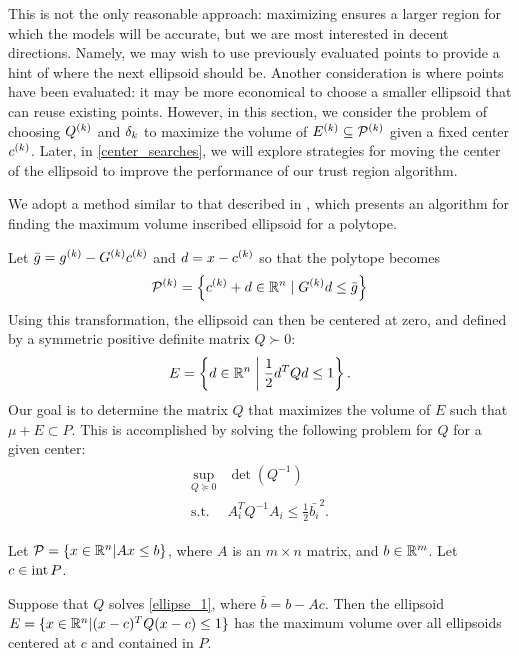 This is not the only reasonable approach: maximizing ensures a larger region for which the models will be accurate, 
but we are most interested in decent directions.
Namely, we may wish to use previously evaluated points to provide a hint of where the next ellipsoid should be.
Another consideration is where points have been evaluated: it may be more economical to choose a smaller ellipsoid that can reuse existing points.
However, in this section,  we consider the problem of choosing ${Q^{(k)}}$ and $\delta_k$ to maximize the volume of ${E^{(k)}} \subseteq {{\mathcal{P}}^{(k)}}$ given a fixed center $c^{(k)}$.
Later, in \cref{center_searches}, we will explore strategies for moving the center of the ellipsoid to improve the performance of our trust region algorithm.

We adopt a method similar to that described in \cite{Khachiyan1993},
which presents an algorithm for finding the maximum volume inscribed ellipsoid for a polytope.

Let $\bar g = {g^{(k)}} - G^{(k)} c^{(k)}$ and $d = x - c^{(k)}$ so that the polytope becomes
\begin{align*}
{{\mathcal{P}}^{(k)}} = \left\{ c^{(k)} + d \in \mathbb R^n \; | \;  G^{(k)} d \le \bar{g} \right\}
\end{align*}
Using this transformation, the ellipsoid can then be centered at zero, and defined by a symmetric positive definite matrix $Q \succ 0$:
\begin{align*}
E = \left\{ d \in \mathbb R^n \; \bigg | \; \frac 1 2 d^T Q d \le 1 \right\}.
\end{align*}
Our goal is to determine the matrix $Q$ that maximizes the volume of $E$ such that $\mu + E \subset P$.
This is accomplished by solving the following problem for $Q$ for a given center:
 \begin{align}
\begin{array}{cc}
 \sup_{Q \succeq 0} & \det(Q^{-1})  \\
 \textrm{s.t.} & A_i^T Q^{-1} A_i \le \frac 1 2 \bar{b_i}^2.
\end{array}
 \label{ellipse_1}
\end{align}


\begin{theorem} 
Let $\mathcal{P} = \{x \in \mathbb R^n | Ax \le b\}$, 
where $A$ is an $m \times n$ matrix, 
and $b \in \mathbb R^m$.  Let $c \in \operatorname{int}{P}$.

Suppose that $Q$ solves \cref{ellipse_1}, where $\bar{b} = b - Ac$.
Then the ellipsoid $E = \{ x \in \mathbb R^n | (x-c)^T Q(x-c) \le 1\}$ has the maximum volume over all ellipsoids centered at $c$ and contained in $P$.
\end{theorem}

